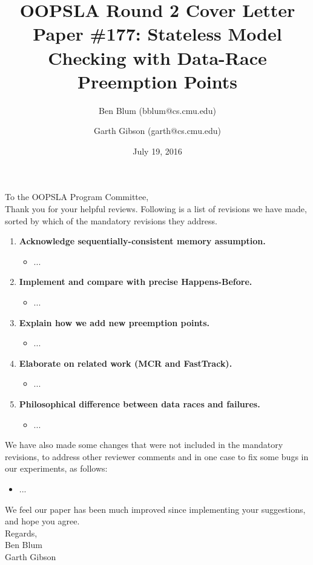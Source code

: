 \documentclass{article}
\title{OOPSLA Round 2 Cover Letter \\ {\large Paper \#177: Stateless Model Checking with Data-Race Preemption Points}}
\author{Ben Blum (\textsf{bblum@cs.cmu.edu}) \and Garth Gibson (\textsf{garth@cs.cmu.edu})}
\date{July 19, 2016}
\begin{document}
\maketitle
\thispagestyle{empty}

\noindent To the OOPSLA Program Committee,
\\

Thank you for your helpful reviews. Following is a list of revisions we have made, sorted by which of the mandatory revisions they address.

\begin{enumerate}
	\item {\bf Acknowledge sequentially-consistent memory assumption.}
	\begin{itemize}
		\item ...
	\end{itemize}
	\item {\bf Implement and compare with precise Happens-Before.}
	\begin{itemize}
		\item ...
	\end{itemize}
	\item {\bf Explain how we add new preemption points.}
	\begin{itemize}
		\item ...
	\end{itemize}
	\item {\bf Elaborate on related work (MCR and FastTrack).}
	\begin{itemize}
		\item ...
	\end{itemize}
	\item {\bf Philosophical difference between data races and failures.}
	\begin{itemize}
		\item ...
	\end{itemize}
\end{enumerate}

We have also made some changes that were not included in the mandatory revisions, to address other reviewer comments and in one case to fix some bugs in our experiments, as follows:

\begin{itemize}
	\item ...
\end{itemize}

We feel our paper has been much improved since implementing your suggestions, and hope you agree.
\\

\noindent Regards,
\\

\noindent Ben Blum \\
Garth Gibson
\end{document}
